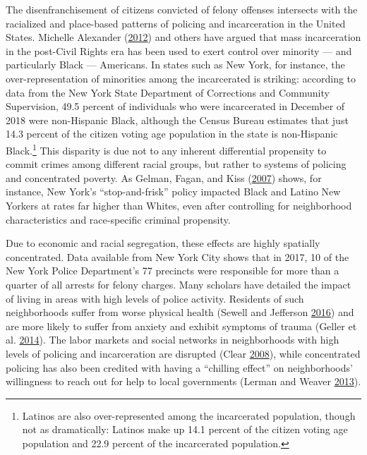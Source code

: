 \documentclass[12pt,]{article}
\let\rmarkdownfootnote\footnote%
\def\footnote{\protect\rmarkdownfootnote}
\begin{document}
The disenfranchisement of citizens convicted of felony offenses intersects with the racialized and place-based patterns of policing and incarceration in the United States. Michelle Alexander (\protect\hyperlink{ref-Alexander2012}{2012}) and others have argued that mass incarceration in the post-Civil Rights era has been used to exert control over minority --- and particularly Black --- Americans. In states such as New York, for instance, the over-representation of minorities among the incarcerated is striking: according to data from the New York State Department of Corrections and Community Supervision, 49.5 percent of individuals who were incarcerated in December of 2018 were non-Hispanic Black, although the Census Bureau estimates that just 14.3 percent of the citizen voting age population in the state is non-Hispanic Black.\footnote{Latinos are also over-represented among the incarcerated population, though not as dramatically: Latinos make up 14.1 percent of the citizen voting age population and 22.9 percent of the incarcerated population.} This disparity is due not to any inherent differential propensity to commit crimes among different racial groups, but rather to systems of policing and concentrated poverty. As Gelman, Fagan, and Kiss (\protect\hyperlink{ref-Gelman2007}{2007}) shows, for instance, New York's ``stop-and-frisk'' policy impacted Black and Latino New Yorkers at rates far higher than Whites, even after controlling for neighborhood characteristics and race-specific criminal propensity.

Due to economic and racial segregation, these effects are highly spatially concentrated. Data available from New York City shows that in 2017, 10 of the New York Police Department's 77 precincts were responsible for more than a quarter of all arrests for felony charges. Many scholars have detailed the impact of living in areas with high levels of police activity. Residents of such neighborhoods suffer from worse physical health (Sewell and Jefferson \protect\hyperlink{ref-Sewell2016}{2016}) and are more likely to suffer from anxiety and exhibit symptoms of trauma (Geller et al. \protect\hyperlink{ref-Geller2014}{2014}). The labor markets and social networks in neighborhoods with high levels of policing and incarceration are disrupted (Clear \protect\hyperlink{ref-Clear2008}{2008}), while concentrated policing has also been credited with having a ``chilling effect'' on neighborhoods' willingness to reach out for help to local governments (Lerman and Weaver \protect\hyperlink{ref-Lerman2013}{2013}).
\end{document}
